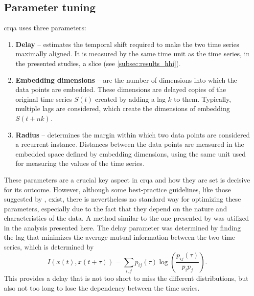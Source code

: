 \subsection{Parameter tuning}
\label{subsec:parameters_crqa}

\Ac{crqa} uses three parameters:

\begin{enumerate}
	\item \textbf{Delay} -- estimates the temporal shift required to make the two time series maximally aligned.
	It is measured by the same time unit as the time series, in the presented studies, a slice (see \cref{subsec:results_hhi}).
	
	\item \textbf{Embedding dimensions} -- are the number of dimensions into which the data points are embedded.
	These dimensions are delayed copies of the original time series $S(t)$ created by adding a lag $k$ to them.
	Typically, multiple lags are considered, which create the dimensions of embedding $S(t + nk)$.
	
	\item \textbf{Radius} -- determines the margin within which two data points are considered a recurrent instance.
	Distances between the data points are measured in the embedded space defined by embedding dimensions, using the same unit used for measuring the values of the time series.
\end{enumerate}
%
These parameters are a crucial key aspect in \ac{crqa} and how they are set is decisive for its outcome.
However, although some best-practice guidelines, like those suggested by \citet{Coco2014crqa-r}, exist, there is nevertheless no standard way for optimizing these parameters, especially due to the fact that they depend on the nature and characteristics of the data.
A method similar to the one presented by \citet{Marwan2007recurrence} was utilized in the analysis presented here.
The delay parameter was determined by finding the lag that minimizes the average mutual information between the two time series, which is determined by
%
\begin{equation}
	\label{eq:average_mutual_information}
	I\left( x(t), x(t + \tau) \right) = \sum_{i,j} p_{ij} (\tau) \log \left( \frac{p_{ij} \left( \tau \right)}{p_i p_j} \right).
\end{equation}
%
This provides a delay that is not too short to miss the different distributions, but also not too long to lose the dependency between the time series.

